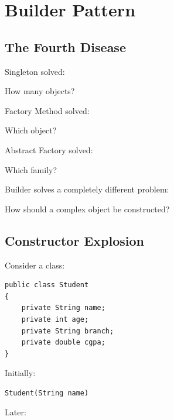 \documentclass[11pt,a4paper]{book}
\begin{document}
\chapter{Builder Pattern}

\section{The Fourth Disease}

\begin{idea}

Singleton solved:

\begin{center}
How many objects?
\end{center}

Factory Method solved:

\begin{center}
Which object?
\end{center}

Abstract Factory solved:

\begin{center}
Which family?
\end{center}

Builder solves a completely different problem:

\begin{center}
How should a complex object be constructed?
\end{center}

\end{idea}


\section{Constructor Explosion}

Consider a class:

\begin{verbatim}
public class Student
{
    private String name;
    private int age;
    private String branch;
    private double cgpa;
}
\end{verbatim}

Initially:

\begin{verbatim}
Student(String name)
\end{verbatim}

Later:
\end{document}
